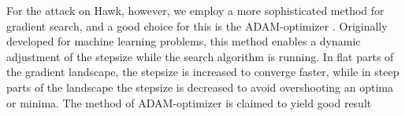 For the attack on Hawk, however, we employ a more sophisticated method for gradient search, and a good choice for this is the ADAM-optimizer \cite{KB17}. Originally developed for machine learning problems, 
this method enables a dynamic adjustment of the stepsize while the search algorithm is running. In flat parts of the gradient landscape, the stepsize is increased to converge faster, 
while in steep parts of the landscape the stepsize is decreased to avoid overshooting an optima or minima. The method of ADAM-optimizer is claimed to yield good result
